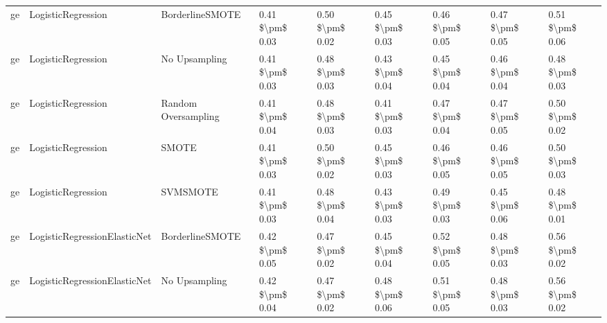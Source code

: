 \begin{tabular}{lllllllll}
      ge &              LogisticRegression &               BorderlineSMOTE & 0.41 \$\textbackslash pm\$ 0.03 &           0.50 \$\textbackslash pm\$ 0.02 &       0.45 \$\textbackslash pm\$ 0.03 &        0.46 \$\textbackslash pm\$ 0.05 &                         0.47 \$\textbackslash pm\$ 0.05 &     0.51 \$\textbackslash pm\$ 0.06 \\
      ge &              LogisticRegression &                 No Upsampling & 0.41 \$\textbackslash pm\$ 0.03 &           0.48 \$\textbackslash pm\$ 0.03 &       0.43 \$\textbackslash pm\$ 0.04 &        0.45 \$\textbackslash pm\$ 0.04 &                         0.46 \$\textbackslash pm\$ 0.04 &     0.48 \$\textbackslash pm\$ 0.03 \\
      ge &              LogisticRegression &           Random Oversampling & 0.41 \$\textbackslash pm\$ 0.04 &           0.48 \$\textbackslash pm\$ 0.03 &       0.41 \$\textbackslash pm\$ 0.03 &        0.47 \$\textbackslash pm\$ 0.04 &                         0.47 \$\textbackslash pm\$ 0.05 &     0.50 \$\textbackslash pm\$ 0.02 \\
      ge &              LogisticRegression &                         SMOTE & 0.41 \$\textbackslash pm\$ 0.03 &           0.50 \$\textbackslash pm\$ 0.02 &       0.45 \$\textbackslash pm\$ 0.03 &        0.46 \$\textbackslash pm\$ 0.05 &                         0.46 \$\textbackslash pm\$ 0.05 &     0.50 \$\textbackslash pm\$ 0.03 \\
      ge &              LogisticRegression &                      SVMSMOTE & 0.41 \$\textbackslash pm\$ 0.03 &           0.48 \$\textbackslash pm\$ 0.04 &       0.43 \$\textbackslash pm\$ 0.03 &        0.49 \$\textbackslash pm\$ 0.03 &                         0.45 \$\textbackslash pm\$ 0.06 &     0.48 \$\textbackslash pm\$ 0.01 \\
      ge &    LogisticRegressionElasticNet &               BorderlineSMOTE & 0.42 \$\textbackslash pm\$ 0.05 &           0.47 \$\textbackslash pm\$ 0.02 &       0.45 \$\textbackslash pm\$ 0.04 &        0.52 \$\textbackslash pm\$ 0.05 &                         0.48 \$\textbackslash pm\$ 0.03 &     0.56 \$\textbackslash pm\$ 0.02 \\
      ge &    LogisticRegressionElasticNet &                 No Upsampling & 0.42 \$\textbackslash pm\$ 0.04 &           0.47 \$\textbackslash pm\$ 0.02 &       0.48 \$\textbackslash pm\$ 0.06 &        0.51 \$\textbackslash pm\$ 0.05 &                         0.48 \$\textbackslash pm\$ 0.03 &     0.56 \$\textbackslash pm\$ 0.02 \\

\end{tabular}
